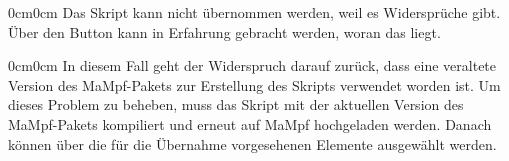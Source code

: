 \documentclass[parskip=off,index=totocnumbered]{scrartcl}
\newenvironment{rückkeinstück2}
	{\begin{adjustwidth}{0cm}{0cm}\footnotesize \singlespace} 
	{\end{adjustwidth} \onehalfspacing}
\begin{document}
\noindent \begin{minipage}{\textwidth}
    \begin{rückkeinstück2}
        Das Skript kann nicht übernommen werden, weil es Widersprüche gibt. Über den Button  kann in Erfahrung gebracht werden, woran das liegt.
        \vspace{0.6cm}
    \end{rückkeinstück2}
\end{minipage}

\noindent \begin{minipage}{\textwidth}
    \begin{rückkeinstück2}
       In diesem Fall geht der Widerspruch darauf zurück, dass eine veraltete Version des MaMpf-Pakets zur Erstellung des Skripts verwendet worden ist. Um dieses Problem zu beheben, muss das Skript mit der aktuellen Version des MaMpf-Pakets kompiliert und erneut auf MaMpf hochgeladen werden. Danach können über  die für die Übernahme vorgesehenen Elemente ausgewählt werden.
        \vspace{0.6cm}
    \end{rückkeinstück2}
\end{minipage}
\end{document}
